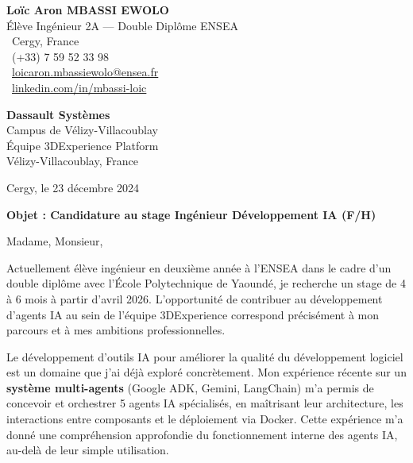 \documentclass[a4paper,11pt]{article}
\begin{document}
\pagestyle{empty}

\noindent
\begin{minipage}[t]{0.55\textwidth}
\textbf{Loïc Aron MBASSI EWOLO} \\
Élève Ingénieur 2A — Double Diplôme ENSEA \\
\faMapMarker\ Cergy, France \\
\faPhone\ (+33) 7 59 52 33 98 \\
\faEnvelope\ \href{mailto:loicaron.mbassiewolo@ensea.fr}{loicaron.mbassiewolo@ensea.fr} \\
\faLinkedin\ \href{https://www.linkedin.com/in/mbassi-loic-3942a9246/}{linkedin.com/in/mbassi-loic}
\end{minipage}
\hfill
\begin{minipage}[t]{0.40\textwidth}
\raggedleft
\textbf{Dassault Systèmes} \\
Campus de Vélizy-Villacoublay \\
Équipe 3DExperience Platform \\
Vélizy-Villacoublay, France
\end{minipage}

\vspace{1cm}

\noindent Cergy, le 23 décembre 2024

\vspace{0.8cm}

\noindent \textbf{Objet : Candidature au stage Ingénieur Développement IA (F/H)}

\vspace{0.6cm}

\noindent Madame, Monsieur,

\vspace{0.4cm}

Actuellement élève ingénieur en deuxième année à l'ENSEA dans le cadre d'un double diplôme avec l'École Polytechnique de Yaoundé, je recherche un stage de 4 à 6 mois à partir d'avril 2026. L'opportunité de contribuer au développement d'agents IA au sein de l'équipe 3DExperience correspond précisément à mon parcours et à mes ambitions professionnelles.

\vspace{0.3cm}

Le développement d'outils IA pour améliorer la qualité du développement logiciel est un domaine que j'ai déjà exploré concrètement. Mon expérience récente sur un \textbf{système multi-agents} (Google ADK, Gemini, LangChain) m'a permis de concevoir et orchestrer 5 agents IA spécialisés, en maîtrisant leur architecture, les interactions entre composants et le déploiement via Docker. Cette expérience m'a donné une compréhension approfondie du fonctionnement interne des agents IA, au-delà de leur simple utilisation.
\end{document}
